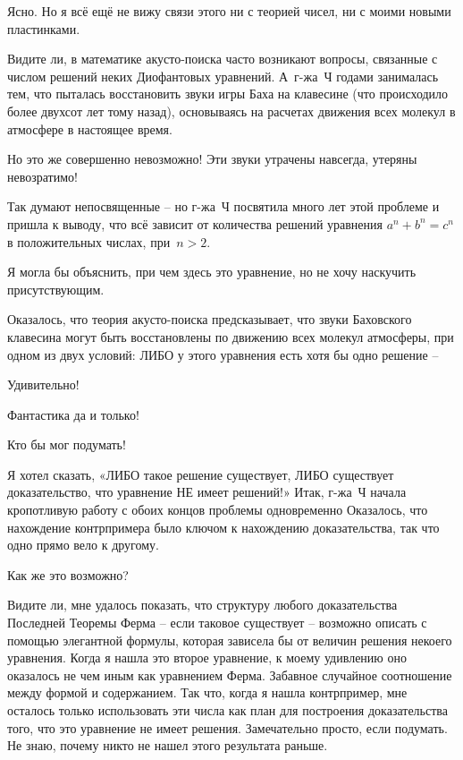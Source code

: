 \documentclass[../main.tex]{subfiles}
\begin{document}
\begin{dialogue}
 Ясно. Но я всё ещё не вижу связи этого ни с теорией чисел, ни с моими новыми пластинками.

 Видите ли, в математике акусто-поиска часто возникают вопросы, связанные с числом решений неких Диофантовых уравнений. А~г-жа~Ч годами занималась тем, что пыталась восстановить звуки игры Баха на клавесине (что происходило более двухсот лет тому назад), основываясь на расчетах движения всех молекул в атмосфере в настоящее время.

 Но это же совершенно невозможно! Эти звуки утрачены навсегда, утеряны невозратимо!

 Так думают непосвященные \--- но г-жа~Ч посвятила много лет этой проблеме и пришла к выводу, что всё зависит от количества решений уравнения $a^n + b^n = c^n$ в положительных числах, при~$n > 2$.

 Я могла бы объяснить, при чем здесь это уравнение, но не хочу наскучить присутствующим.

 Оказалось, что теория акусто-поиска предсказывает, что звуки Баховского клавесина могут быть восстановлены по движению всех молекул атмосферы, при одном из двух условий: ЛИБО у этого уравнения есть хотя бы одно решение \---

 Удивительно!

 Фантастика да и только!

 Кто бы мог подумать!

 Я хотел сказать, «ЛИБО такое решение существует, ЛИБО существует доказательство, что уравнение НЕ имеет решений!» Итак, г-жа~Ч начала кропотливую работу с обоих концов проблемы одновременно Оказалось, что нахождение контрпримера было ключом к нахождению доказательства, так что одно прямо вело к другому.

 Как же это возможно?

 Видите ли, мне удалось показать, что структуру любого доказательства Последней Теоремы Ферма \--- если таковое существует \--- возможно описать с помощью элегантной формулы, которая зависела бы от величин решения некоего уравнения. Когда я нашла это второе уравнение, к моему удивлению оно оказалось не чем иным как уравнением Ферма. Забавное случайное соотношение между формой и содержанием. Так что, когда я нашла контрпример, мне осталось только использовать эти числа как план для построения доказательства того, что это уравнение не имеет решения. Замечательно просто, если подумать. Не знаю, почему никто не нашел этого результата раньше.


\end{dialogue}
\end{document}
